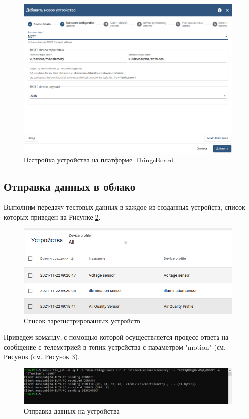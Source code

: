 \documentclass[a4paper,14pt]{extarticle}
\newcommand{\tb}{ThingsBoard~}
\begin{document}
\begin{figure}[h!]
	\centering
	\includegraphics[width=0.7\linewidth]{images/task9-create2}
	\caption{Настройка устройства на платформе \tb}
	\label{fig:task9-create2}
\end{figure}

\subsection{Отправка данных в облако}

Выполним передачу тестовых данных в каждое из созданных устройств, список которых приведен на Рисунке \ref{fig:devices}.

\begin{figure}[h!]
	\centering
	\includegraphics[width=0.7\linewidth]{images/devices}
	\caption{Список зарегистрированных устройств}
	\label{fig:devices}
\end{figure}

Приведем команду, с помощью которой осуществляется процесс ответа на сообщение с телеметрией в топик устройства с параметром "motion" (см. Рисунок (см. Рисунок \ref{fig:send}).

\begin{figure}[h!]
	\centering
	\includegraphics[width=0.7\linewidth]{images/send}
	\caption{Отправка данных на устройства}
	\label{fig:send}
\end{figure}
\end{document}
